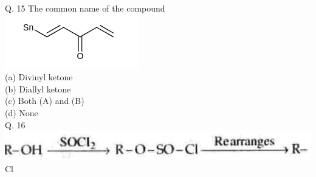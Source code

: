 \documentclass[10pt]{article}
\begin{document}
Q. 15 The common name of the compound\\
\includegraphics{smile-b58c69c11e32a94f271688c1c4c8a5ff34c03935}\\
(a) Divinyl ketone\\
(b) Diallyl ketone\\
(c) Both (A) and (B)\\
(d) None\\
Q. 16\\
\includegraphics[max width=\textwidth]{2025_01_28_8470952b98110cec3aabg-133} Cl
\end{document}
